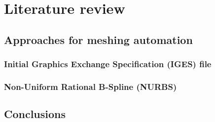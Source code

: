 
\chapter{Literature review}






\section{Approaches for meshing automation}

    \subsection{Initial Graphics Exchange Specification (IGES) file}
    \label{lr_sc:iges}

    \subsection{Non-Uniform Rational B-Spline (NURBS)}
    

\section{Conclusions}